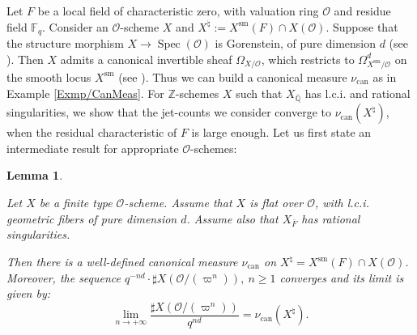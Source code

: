 \documentclass[11pt,english]{article}
\numberwithin{equation}{section}
\numberwithin{figure}{section}
\theoremstyle{definition}
\theoremstyle{plain}
\newtheorem{lem}[df]{Lemma}
\theoremstyle{remark}
\DeclareMathOperator{\Spec}{Spec}
\newcommand\ZZ{\mathbb{Z}}
\begin{document}
Let $F$ be a local field of characteristic zero, with valuation ring
$\mathcal{O}$ and residue field $\mathbb{F}_{q}$. Consider an $\mathcal{O}$-scheme
$X$ and $X^{\natural}:=X^{\mathrm{sm}}(F)\cap X(\mathcal{O})$. Suppose
that the structure morphism $X\rightarrow\Spec(\mathcal{O})$ is Gorenstein,
of pure dimension $d$ (see \cite[\href{https://stacks.math.columbia.edu/tag/0C02}{Tag 0C02}]{SP}).
Then $X$ admits a canonical invertible sheaf $\Omega_{X/\mathcal{O}}$,
which restricts to $\Omega_{X^{\mathrm{sm}}/\mathcal{O}}^{d}$ on
the smooth locus $X^{\mathrm{sm}}$ (see \cite[\S 3.5.]{Con00}).
Thus we can build a canonical measure $\nu_{\mathrm{can}}$ as in
Example \ref{Exmp/CanMeas}. For $\ZZ$-schemes $X$ such that $X_{\overline{\mathbb{Q}}}$
has l.c.i. and rational singularities, we show that the jet-counts
we consider converge to $\nu_{\mathrm{can}}(X^{\natural})$, when
the residual characteristic of $F$ is large enough. Let us first
state an intermediate result for appropriate $\mathcal{O}$-schemes:

\begin{lem} \label{Lem/JetCountCanMeas}

Let $X$ be a finite type $\mathcal{O}$-scheme. Assume that $X$
is flat over $\mathcal{O}$, with l.c.i. geometric fibers of pure
dimension $d$. Assume also that $X_{\bar{F}}$ has rational singularities.

Then there is a well-defined canonical measure $\nu_{\mathrm{can}}$
on $X^{\natural}=X^{\mathrm{sm}}(F)\cap X(\mathcal{O})$. Moreover,
the sequence $q^{-nd}\cdot\sharp X(\mathcal{O}/(\varpi^{n})),\ n\geq1$
converges and its limit is given by:\[
\underset{n\rightarrow +\infty}{\lim}\frac{\sharp X(\mathcal{O}/(\varpi^{n}))}{q^{nd}}
=
\nu_{\mathrm{can}}(X^{\natural}).
\]\end{lem}
\end{document}
